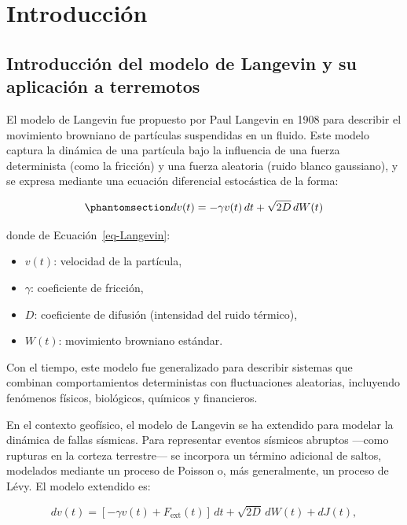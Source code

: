\documentclass[
  spanish,
  us-letterpaper,
]{scrreprt}
\providecommand{\tightlist}{%
  \setlength{\itemsep}{0pt}\setlength{\parskip}{0pt}}
\theoremstyle{plain}
\theoremstyle{plain}
\theoremstyle{definition}
\theoremstyle{plain}
\theoremstyle{remark}
\begin{document}
\chapter{Introducción}\label{introducciuxf3n}

\section{Introducción del modelo de Langevin y su aplicación a
terremotos}\label{introducciuxf3n-del-modelo-de-langevin-y-su-aplicaciuxf3n-a-terremotos}

El modelo de Langevin fue propuesto por Paul Langevin en 1908 para
describir el movimiento browniano de partículas suspendidas en un
fluido. Este modelo captura la dinámica de una partícula bajo la
influencia de una fuerza determinista (como la fricción) y una fuerza
aleatoria (ruido blanco gaussiano), y se expresa mediante una ecuación
diferencial estocástica de la forma:

\begin{equation}\phantomsection\label{eq-Langevin}{ 
dv(t) = -\gamma v(t)\,dt + \sqrt{2D}\,dW(t) 
}\end{equation}

donde de Ecuación~\ref{eq-Langevin}:

\begin{itemize}
\tightlist
\item
  \(v(t)\): velocidad de la partícula,
\item
  \(\gamma\): coeficiente de fricción,
\item
  \(D\): coeficiente de difusión (intensidad del ruido térmico),
\item
  \(W(t)\): movimiento browniano estándar.
\end{itemize}

Con el tiempo, este modelo fue generalizado para describir sistemas que
combinan comportamientos deterministas con fluctuaciones aleatorias,
incluyendo fenómenos físicos, biológicos, químicos y financieros.

En el contexto geofísico, el modelo de Langevin se ha extendido para
modelar la dinámica de fallas sísmicas. Para representar eventos
sísmicos abruptos ---como rupturas en la corteza terrestre--- se
incorpora un término adicional de saltos, modelados mediante un proceso
de Poisson o, más generalmente, un proceso de Lévy. El modelo extendido
es:

\[
dv(t) = [-\gamma v(t) + F_{\text{ext}}(t)]\,dt + \sqrt{2D}\,dW(t) + dJ(t),
\]
\end{document}
